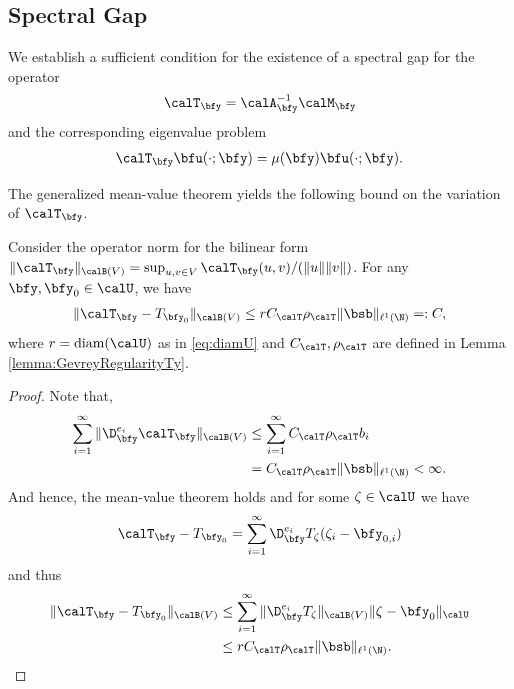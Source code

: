 
\subsection{Spectral Gap}
We establish a sufficient condition for the existence of a spectral gap for the operator
\begin{align*}
    \calT_{\bfy} = \calA_{\bfy}^{-1} \calM_{\bfy}
\end{align*}
and the corresponding eigenvalue problem 
\begin{align}\label{eq:eigenvalueProblem}
    \calT_{\bfy} \bfu(\cdot; \bfy) = \mu(\bfy) \bfu( \cdot;\bfy) .
\end{align}


The generalized mean-value theorem yields the following bound on the variation of $\calT_{\bfy}$. 
\begin{lemma}\label{lemma:variationboundTy}
Consider the operator norm for the bilinear form $ \| \calT_{\bfy} \|_{\calB(V)} = \sup_{u,v \in V} \calT_{\bfy}(u,v) /( \| u \| \| v \| ) $.
    For any $ \bfy, \bfy_0 \in \calU$, we have
    \begin{align}
        \| \calT_{\bfy} - T_{\bfy_0} \|_{\calB(V)} \leq r C_{\calT} \rho_{\calT}  \| \bsb \|_{\ell^1(\N)} =: C,
    \end{align}
    where $r = \text{diam}(\calU)$ as in \eqref{eq:diamU} and $C_{\calT},\rho_{\calT}$ are defined in Lemma \ref{lemma:GevreyRegularityTy}.
\end{lemma}
\begin{proof}
    Note that, 
   \begin{align*}
        \sum_{i=1}^\infty  \| \D^{e_i}_{\bfy} \calT_{\bfy} \|_{\calB(V)} &\leq  \sum_{i=1}^\infty C_{\calT}\rho_{\calT} b_i \\
        &=  C_{\calT}\rho_{\calT} \| \bsb \|_{\ell^1(\N)} < \infty.
   \end{align*} 
   And hence, the mean-value theorem 
   holds and for some $\zeta \in \calU$ we have
   \begin{align*}
       \calT_{\bfy} - T_{\bfy_0} = \sum_{i=1}^\infty \D^{e_i}_{\bfy} T_{\zeta} (\zeta_i - \bfy_{0,i})
   \end{align*}
   and thus
   \begin{align*}
       \| \calT_{\bfy} - T_{\bfy_0} \|_{\calB(V)} & \leq  \sum_{i=1}^\infty  \| \D^{e_i}_{\bfy} T_{\zeta} \|_{\calB(V)}  \| \zeta - \bfy_0 \|_{\calU}  \\
       & \leq  r C_{\calT}\rho_{\calT} \| \bsb \|_{\ell^1(\N)}.
   \end{align*}
\end{proof}

